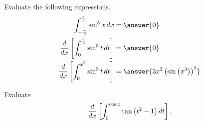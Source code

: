 \documentclass{ximera}
\author{Nela Lakos \and Kyle Parsons}
\begin{document}
\begin{exercise}

Evaluate the following expressions.
\begin{align*}
\int_{-\frac{\pi}{2}}^\frac{\pi}{2} \sin^5 x \d x &= \answer{0}\\
\dd{x}\left[\int_0^\frac{\pi}{2} \sin^5 t \d t\right] &= \answer{0}\\
\dd{x}\left[\int_0^{x^3} \sin^5 t \d t\right] &= \answer{3x^2\left(\sin\left(x^3\right)\right)^5}\\
\end{align*}

Evaluate
\[
\frac{\mathop{}\!d }{\mathop{}\!d x}\left[\int_0^{\cos x} \tan\left(t^2-1\right) \mathop{}\!d t\right].
\]

\begin{multipleChoice}
\end{multipleChoice}

\end{exercise}
\end{document}
